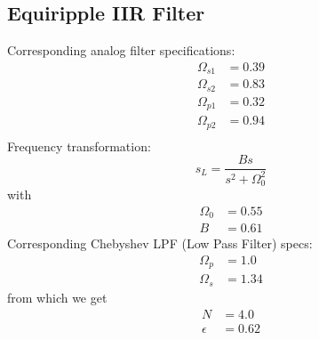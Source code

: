 \documentclass[12pt,a4paper]{scrartcl}
\begin{document}
		\subsection{Equiripple IIR Filter}
			Corresponding analog filter specifications:
			\begin{align}
				\Omega_{s1} &= 0.39 \\
				\Omega_{s2} &= 0.83 \\
				\Omega_{p1} &= 0.32 \\
				\Omega_{p2} &= 0.94 \\
			\end{align}
			Frequency transformation: 
			\begin{equation}
			s_L = \frac{B s}{s^2 + \Omega_0^2}
			\end{equation}
			with
			\begin{align}
				\Omega_0 &= 0.55 \\
				B &= 0.61
			\end{align}
			Corresponding Chebyshev LPF (Low Pass Filter) specs:
			\begin{align}
				\Omega_p &= 1.0 \\
				\Omega_s &= 1.34
			\end{align}
			from which we get
			\begin{align}
				N &= 4.0 \\
				\epsilon &= 0.62
			\end{align}
\end{document}
